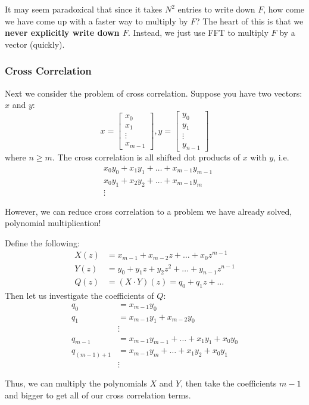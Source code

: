 It may seem paradoxical that since it takes $N^2$ entries to write down $F$, how come we have come up with a faster way to multiply
by $F$?
The heart of this is that we \textbf{never explicitly write down $F$}. Instead, we just use FFT to multiply $F$ by a vector (quickly).

\subsubsection{Cross Correlation}
Next we consider the problem of cross correlation. Suppose you have two vectors: $x$ and $y$:
\[ x = \begin{bmatrix}
    x_0 \\ x_1 \\ \vdots \\ x_{m - 1}
\end{bmatrix}, y = \begin{bmatrix}
    y_0 \\ y_1 \\ \vdots \\ y_{n - 1}
\end{bmatrix} \]
where $n \geq m$. The cross correlation is all shifted dot products of $x$ with $y$, i.e.
\begin{align*}
    &x_0 y_0 + x_1 y_1 + \dots + x_{m - 1}y_{m - 1} \\
    &x_0 y_1 + x_2 y_2 + \dots + x_{m - 1}y_{m} \\
    &\vdots
\end{align*}

However, we can reduce cross correlation to a problem we have already solved, polynomial multiplication!

\begin{algothm} 
    Define the following:
    \begin{align*}
        X(z) &= x_{m - 1} + x_{m - 2}z + \dots + x_0 z^{m - 1} \\
        Y(z) &= y_0 + y_1 z + y_2 z^2 + \dots + y_{n - 1}z^{n - 1}\\
        Q(z) &= (X \cdot Y)(z) = q_0 + q_1z + \dots
    \end{align*}
    Then let us investigate the coefficients of $Q$:
    \begin{align*}
        q_0 &= x_{m - 1}y_0 \\
        q_1 &= x_{m - 1}y_1 + x_{m - 2}y_0 \\
        &\vdots \\
        q_{m - 1} &= x_{m - 1}y_{m - 1} + \dots + x_1 y_1 + x_0 y_0 \\
        q_{(m - 1) + 1} &= x_{m - 1}y_{m} + \dots + x_1 y_2 + x_0 y_1 \\
        &\vdots
    \end{align*}

    Thus, we can multiply the polynomials $X$ and $Y$, then take the coefficients
    $m - 1$ and bigger to get all of our cross correlation terms.
\end{algothm}
\endinput